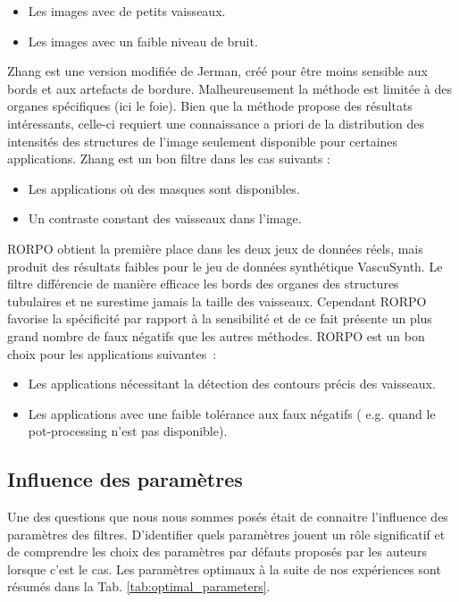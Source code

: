 \begin{itemize}
\item Les images avec de petits vaisseaux.
\item Les images avec un faible niveau de bruit.
\end{itemize} 

Zhang est une version modifiée de Jerman, créé pour être moins sensible aux bords et aux artefacts de bordure. Malheureusement la méthode est limitée à des organes spécifiques (ici le  foie). Bien que la méthode propose des résultats intéressants, celle-ci requiert une connaissance a priori de la distribution des intensités des structures de l'image seulement disponible pour certaines applications. Zhang est un bon filtre dans les cas suivants :

\begin{itemize}
\item Les applications où des masques sont disponibles.
\item Un contraste constant des vaisseaux dans l'image.
\end{itemize}

RORPO obtient la première place dans les deux jeux de données réels, mais produit des résultats faibles pour le jeu de données synthétique VascuSynth. Le filtre différencie de manière efficace les bords des organes des structures tubulaires et ne surestime jamais la taille des vaisseaux. Cependant RORPO favorise la spécificité par rapport à la sensibilité et de ce fait présente un plus grand nombre de faux négatifs que les autres méthodes. RORPO est un bon choix pour les applications suivantes~:

\begin{itemize}
  \item Les applications nécessitant la détection des contours précis des vaisseaux.
  \item Les applications avec une faible tolérance aux faux négatifs ( e.g. quand le pot-processing n'est pas disponible). 
\end{itemize}

\subsection{Influence des paramètres}

Une des questions que nous nous sommes posés était de connaitre l'influence des paramètres des filtres. D'identifier quels paramètres jouent un rôle significatif et de comprendre les choix des paramètres par défauts proposés par les auteurs lorsque c'est le cas. Les paramètres optimaux à la suite de nos expériences sont résumés dans la Tab. \ref{tab:optimal_parameters}.

